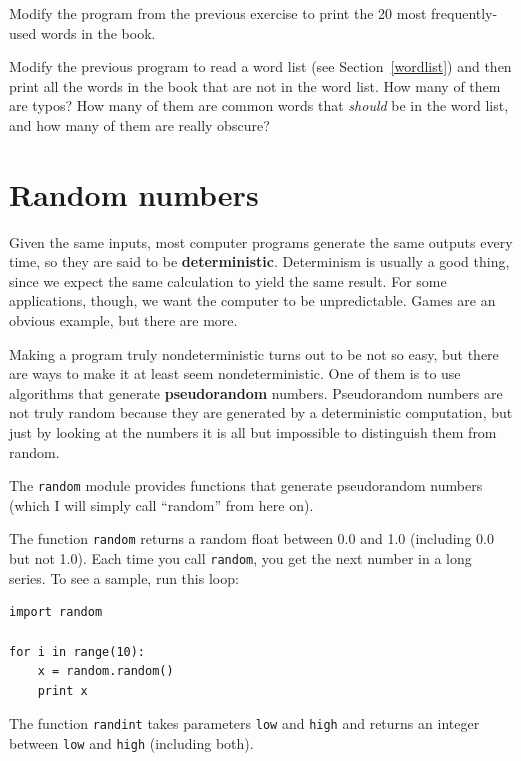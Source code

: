 \documentclass[10pt]{book}
\begin{document}
\begin{ex}
Modify the program from the previous exercise to print the
20 most frequently-used words in the book.
\end{ex}


\begin{ex}
Modify the previous program to read a word list (see
Section~\ref{wordlist}) and then print all the words in the book that
are not in the word list.  How many of them are typos?  How many of
them are common words that {\em should} be in the word list, and how
many of them are really obscure?
\end{ex}


\section{Random numbers}


Given the same inputs, most computer programs generate the same
outputs every time, so they are said to be {\bf deterministic}.
Determinism is usually a good thing, since we expect the same
calculation to yield the same result.  For some applications, though,
we want the computer to be unpredictable.  Games are an obvious
example, but there are more.

Making a program truly nondeterministic turns out to be not so easy,
but there are ways to make it at least seem nondeterministic.  One of
them is to use algorithms that generate {\bf pseudorandom} numbers.
Pseudorandom numbers are not truly random because they are generated
by a deterministic computation, but just by looking at the numbers it
is all but impossible to distinguish them from random.


The {\tt random} module provides functions that generate
pseudorandom numbers (which I will simply call ``random'' from
here on).


The function {\tt random} returns a random float
between 0.0 and 1.0 (including 0.0 but not 1.0).  Each time you
call {\tt random}, you get the next number in a long series.  To see a
sample, run this loop:

\beforeverb
\begin{verbatim}
import random

for i in range(10):
    x = random.random()
    print x
\end{verbatim}
\afterverb
%
The function {\tt randint} takes parameters {\tt low} and
{\tt high} and returns an integer between {\tt low} and
{\tt high} (including both).
\end{document}
